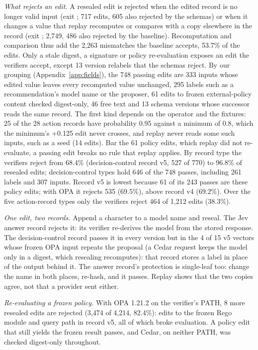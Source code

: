 \documentclass[letterpaper]{article} %
\makeatletter
\def\code@keepspaces{\Url@Edit\Url@String{ }{+}}}
\DeclareRobustCommand{\code}{\leavevmode\begingroup \urlstyle{tt}%
  \let\Url@ObeySp\code@keepspaces \def\Url@space{\penalty\UrlBreakPenalty\ }\Url}
\makeatother
\begin{document}
\emph{What rejects an edit.} A resealed edit is rejected when the edited
record is no longer valid input (exit \code{2}; 717 edits, 605 also rejected
by the schemas) or when it changes a value that replay recomputes or
compares with a copy elsewhere in the record (exit \code{1}; 2,749, 486 also
rejected by the baseline). Recomputation and comparison thus add the 2,263
mismatches the baseline accepts, 53.7\% of the edits. Only a stale digest,
a signature or policy re-evaluation exposes an edit the verifiers accept,
except 13 version relabels that the schemas reject.
By our grouping (Appendix~\ref{app:fields}), the 748
passing edits are 333 inputs whose edited value leaves
every recomputed value unchanged, 295 labels such as a recommendation's model
name or the proposer, 61 edits to frozen external-policy content checked
digest-only, 46 free text and 13 schema versions whose successor reads the
same record. The first kind depends on the operator and the fixtures: 25 of
the 28 action records have probability 0.95 against a minimum of 0.8, which
the minimum's +0.125 edit never crosses, and replay never reads some such inputs, such as a
seed (14 edits). Bar the 61 policy edits, which replay did not re-evaluate,
a passing edit breaks no rule that replay applies. By record type the
verifiers reject from 68.4\% (decision-control record v5, 527 of 770) to
96.8\% of resealed edits; decision-control types hold 646 of the 748
passes, including 261 labels and 307 inputs. Record v5 is lowest because
61 of its 243 passes are these policy edits; with OPA it rejects 535
(69.5\%), above record v4 (69.2\%). Over the five action-record types only
the verifiers reject 464 of 1,212 edits (38.3\%).

\emph{One edit, two records.} Append a character to a model name and reseal.
The Jev answer record rejects it: its verifier re-derives the model
from the stored response. The decision-control
record passes it in every version but in the 4 of 15 v5 vectors whose
frozen OPA input repeats the proposal (a Cedar request keeps the model only
in a digest, which resealing recomputes): that record stores a label in place
of the output behind it. The answer record's protection is single-leaf too:
change the name in both places, re-hash, and it passes. Replay shows that
the two copies agree, not that a provider sent either.

\emph{Re-evaluating a frozen policy.} With OPA 1.21.2 on the verifier's PATH,
8 more resealed edits are rejected (3,474 of 4,214, 82.4\%): edits to the
frozen Rego module and query path in record v5, all of which broke
evaluation. A policy edit that still yields the frozen result passes, and
Cedar, on neither PATH, was checked digest-only throughout.
\end{document}
